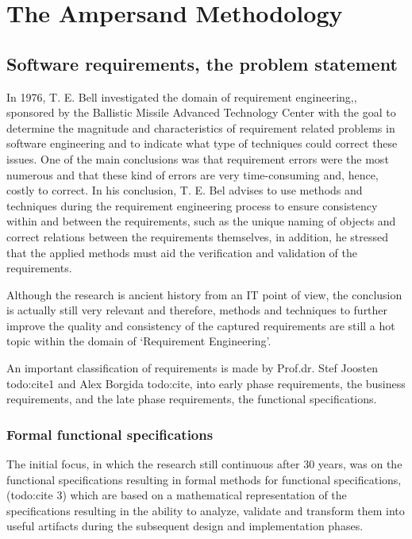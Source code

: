 
\section{The Ampersand Methodology}
\label{sec:AmpersandTheory}

\subsection{Software requirements, the problem statement}

In 1976,  T. E. Bell investigated the domain of requirement engineering,, sponsored by the Ballistic Missile Advanced Technology Center with the goal to determine the magnitude and characteristics of requirement related problems in software engineering and to indicate what type of techniques could correct these issues. 
One of the main conclusions was that requirement errors were the most numerous and that these kind of errors are very time-consuming and, hence, costly to correct.
In his conclusion,  T. E. Bel advises to use methods and techniques during the requirement engineering process to ensure consistency within and  between the requirements, such as the unique naming of objects and correct relations between the requirements themselves, in addition, he stressed that the applied methods must aid the verification and validation of the requirements.
 
Although the research is ancient history from an IT point of view, the conclusion is actually still very relevant and therefore, methods and techniques to further improve the quality and consistency of the captured requirements are still a hot topic within the domain of `Requirement Engineering'.

An important classification of requirements is made by  Prof.dr. Stef Joosten todo:cite1 and Alex Borgida todo:cite, into early phase requirements, the business requirements, and the late phase requirements, the functional specifications. 

\subsubsection{Formal functional specifications}
The initial focus, in which the research still continuous after 30 years, was on the functional specifications resulting in formal methods for functional specifications, (todo:cite 3) which are based on a mathematical representation of the specifications resulting in the ability to analyze, validate and transform them into useful artifacts during the subsequent design and implementation phases. 

